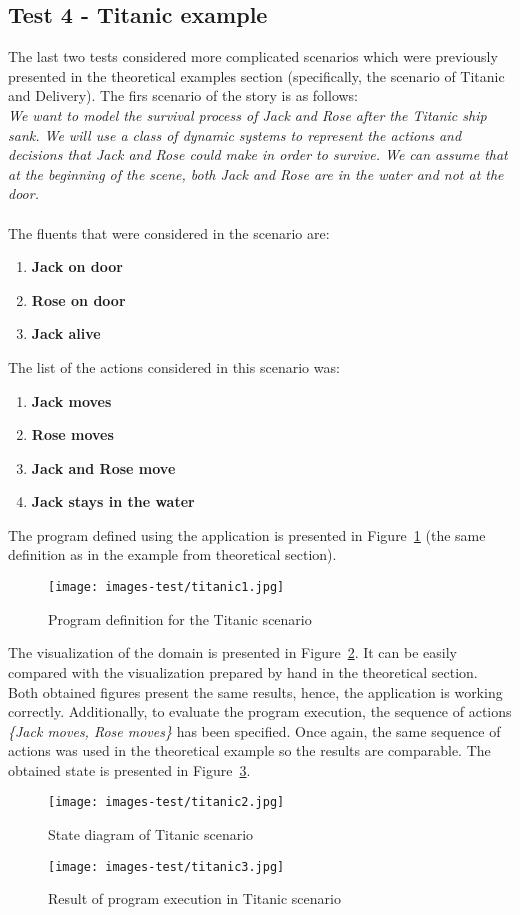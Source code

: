 \documentclass[a4paper]{article}
\begin{document}
\subsection{Test 4 - Titanic example}
%
The last two tests considered more complicated scenarios which were previously presented in the theoretical examples section (specifically, the scenario of Titanic and Delivery). The firs scenario of the story is as follows:
\\[0.5\baselineskip]
\textit{We want to model the survival process of Jack and Rose after the Titanic ship sank. We will use a class of dynamic systems to represent the actions and decisions that Jack and Rose could make in order to survive. We can assume that at the beginning of the scene, both Jack and Rose are in the water and not at the door.} \\ \\
The fluents that were considered in the scenario are:
\begin{enumerate}
    \item \textbf{Jack on door}
    \item \textbf{Rose on door}
    \item \textbf{Jack alive}
\end{enumerate}
The list of the actions considered in this scenario was:
\begin{enumerate}
    \item \textbf{Jack moves}
    \item \textbf{Rose moves}
    \item \textbf{Jack and Rose move}
    \item \textbf{Jack stays in the water}
\end{enumerate}
The program defined using the application is presented in Figure~\ref{fig:ysp11} (the same definition as in the example from theoretical section).
\begin{figure}[htp]
    \centering
    \texttt{[image: images-test/titanic1.jpg]}
    \caption{Program definition for the Titanic scenario}
    \label{fig:ysp11}
\end{figure}
The visualization of the domain is presented in Figure~\ref{fig:ysp12}. It can be easily compared with the visualization prepared by hand in the theoretical section. Both obtained figures present the same results, hence, the application is working correctly. Additionally, to evaluate the program execution, the sequence of actions \textit{\{Jack moves, Rose moves\}} has been specified. Once again, the same sequence of actions was used in the theoretical example so the results are comparable. The obtained state is presented in Figure~\ref{fig:ysp13}.
\begin{figure}[htp]
    \centering
    \texttt{[image: images-test/titanic2.jpg]}
    \caption{State diagram of Titanic scenario}
    \label{fig:ysp12}
\end{figure}
\begin{figure}[htp]
    \centering
    \texttt{[image: images-test/titanic3.jpg]}
    \caption{Result of program execution in Titanic scenario}
    \label{fig:ysp13}
\end{figure}
\end{document}
